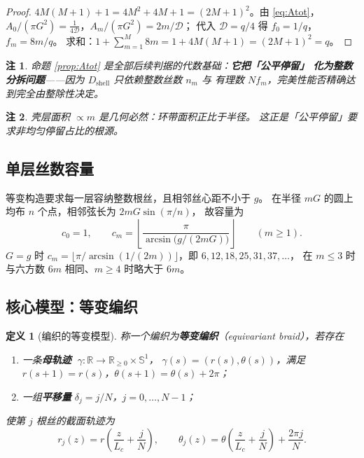 \documentclass[12pt, a4paper]{ctexart}
\newtheorem{definition}{定义}[section]
\newtheorem{remark}{注}[section]
\begin{document}
\begin{proof}
$4M(M+1)+1 = 4M^2+4M+1 = (2M+1)^2$。由 \eqref{eq:Atot}，
$A_0/(\pi G^2)=\frac{1}{4\mathcal{D}}$，$A_m/(\pi G^2)=2m/\mathcal{D}$；
代入 $\mathcal{D}=q/4$ 得 $f_0=1/q$，$f_m=8m/q$。
求和：$1+\sum_{m=1}^{M}8m = 1+4M(M+1) = (2M+1)^2 = q$。
\end{proof}

\begin{remark}
命题 \ref{prop:Atot} 是全部后续判据的代数基础：\textbf{它把「公平停留」
化为整数分拆问题}——因为 $D_{\mathrm{shell}}$ 只依赖整数丝数 $n_m$ 与
有理数 $Nf_m$，完美性能否精确达到完全由整除性决定。
\end{remark}

\begin{remark}
壳层面积 $\propto m$ 是几何必然：环带面积正比于半径。
这正是「公平停留」要求非均匀停留占比的根源。
\end{remark}

\subsection{单层丝数容量}

等变构造要求每一层容纳整数根丝，且相邻丝心距不小于 $g$。
在半径 $mG$ 的圆上均布 $n$ 个点，相邻弦长为 $2mG\sin(\pi/n)$，
故容量为
\begin{equation}
c_0 = 1,\qquad
c_m = \left\lfloor \frac{\pi}{\arcsin\!\big(g/(2mG)\big)} \right\rfloor
\qquad (m\ge1).
\label{eq:cap}
\end{equation}
$G=g$ 时 $c_m = \lfloor \pi/\arcsin(1/(2m))\rfloor$，即 $6,12,18,25,31,37,\dots$，
在 $m\le3$ 时与六方数 $6m$ 相同、$m\ge4$ 时略大于 $6m$。

\subsection{核心模型：等变编织}

\begin{definition}[编织的等变模型]
称一个编织为\textbf{等变编织}（equivariant braid），若存在
\begin{enumerate}[label=(\alph*), leftmargin=2.4em, itemsep=2pt]
\item 一条\textbf{母轨迹} $\;\gamma:\mathbb{R}\to\mathbb{R}_{\ge0}\times\mathbb{S}^1$，
$\gamma(s) = (r(s),\theta(s))$，满足 $r(s+1)=r(s)$，$\theta(s+1)=\theta(s)+2\pi$；
\item 一组\textbf{平移量} $\delta_j = j/N$，$j=0,\dots,N-1$；
\end{enumerate}
使第 $j$ 根丝的截面轨迹为
\begin{equation}
r_j(z) = r\!\left(\frac{z}{L_c}+\frac{j}{N}\right),\qquad
\theta_j(z) = \theta\!\left(\frac{z}{L_c}+\frac{j}{N}\right)+\frac{2\pi j}{N}.
\label{eq:equivariant}
\end{equation}
\end{definition}
\end{document}
